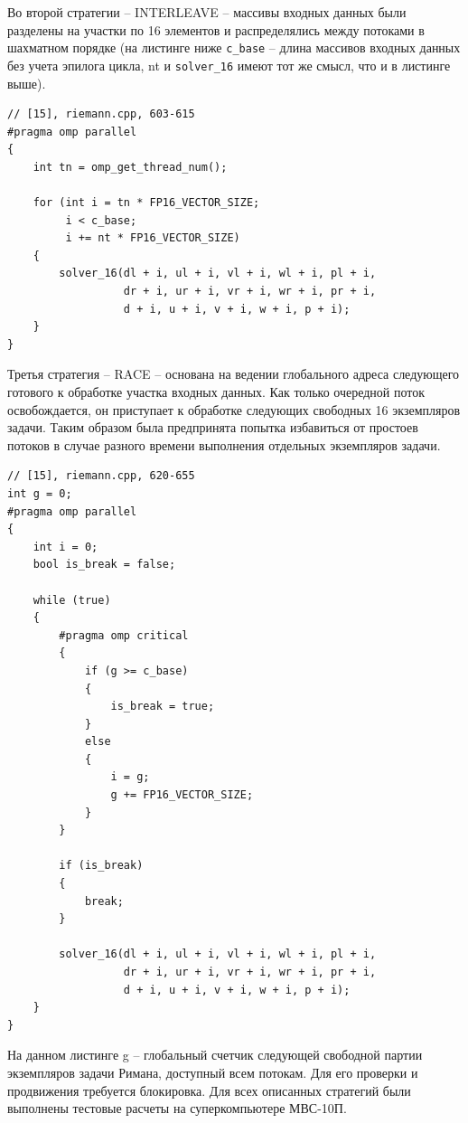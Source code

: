 Во второй стратегии -- INTERLEAVE -- массивы входных данных были разделены на участки по 16 элементов и распределялись между потоками в шахматном порядке (на листинге ниже \texttt{c\_base} -- длина массивов входных данных без учета эпилога цикла, nt и \texttt{solver\_16} имеют тот же смысл, что и в листинге выше).

\begin{lstlisting}[caption={caption},label={label}]
// [15], riemann.cpp, 603-615
#pragma omp parallel
{
    int tn = omp_get_thread_num();

    for (int i = tn * FP16_VECTOR_SIZE;
         i < c_base;
         i += nt * FP16_VECTOR_SIZE)
    {
        solver_16(dl + i, ul + i, vl + i, wl + i, pl + i,
                  dr + i, ur + i, vr + i, wr + i, pr + i,
                  d + i, u + i, v + i, w + i, p + i);
    }
}
\end{lstlisting}

Третья стратегия -- RACE -- основана на ведении глобального адреса следующего готового к обработке участка входных данных.
Как только очередной поток освобождается, он приступает к обработке следующих свободных 16 экземпляров задачи. Таким образом была предпринята попытка избавиться от простоев потоков в случае разного времени выполнения отдельных экземпляров задачи.

\begin{lstlisting}[caption={caption},label={label}]
// [15], riemann.cpp, 620-655
int g = 0;
#pragma omp parallel
{
    int i = 0;
    bool is_break = false;

    while (true)
    {
        #pragma omp critical
        {
            if (g >= c_base)
            {
                is_break = true;
            }
            else
            {
                i = g;
                g += FP16_VECTOR_SIZE;
            }
        }

        if (is_break)
        {
            break;
        }

        solver_16(dl + i, ul + i, vl + i, wl + i, pl + i,
                  dr + i, ur + i, vr + i, wr + i, pr + i,
                  d + i, u + i, v + i, w + i, p + i);
    }
} 
\end{lstlisting}

На данном листинге g -- глобальный счетчик следующей свободной партии экземпляров задачи Римана, доступный всем потокам.
Для его проверки и продвижения требуется блокировка.
Для всех описанных стратегий были выполнены тестовые расчеты на суперкомпьютере МВС-10П.

